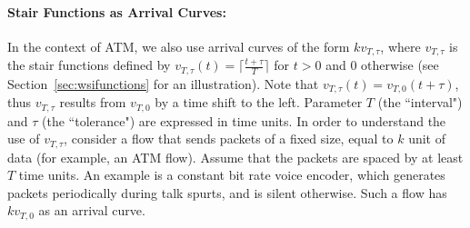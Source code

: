 \paragraph{Stair Functions as Arrival Curves: }
In the context of ATM, we also use arrival curves of the form $k
v_{T, \tau}$, where $v_{T, \tau}$ is the stair functions defined
by
  $v_{T, \tau}(t) = \lceil \frac{t+ \tau}{T} \rceil$ for $t>0$ and
  $0$ otherwise
(see Section~\ref{sec:wsifunctions} for an illustration). Note
that $v_{T, \tau}(t) = v_{T, 0}(t+\tau)$, thus $v_{T, \tau}$
results from $v_{T, 0}$ by a time shift to the left. Parameter $T$
(the ``interval") and $\tau$ (the ``tolerance") are expressed in
time units.
In order to understand the use of $v_{T, \tau}$, consider a flow
that sends packets of a fixed size, equal to $k$ unit of data (for
example, an ATM flow). Assume that the packets are spaced by at
least $T$ time units. An example is a constant bit rate voice
encoder, which generates packets periodically during talk spurts,
and is silent otherwise. Such a flow has $k v_{T, 0}$ as an
arrival curve.

